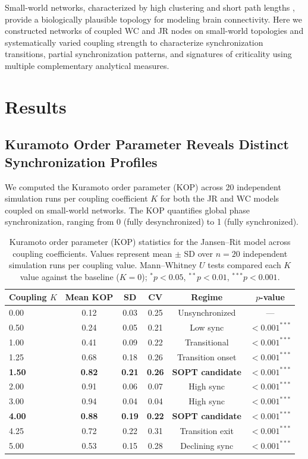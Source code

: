 \documentclass[11pt]{article}
\begin{document}
Small-world networks, characterized by high clustering and short path lengths \citep{watts1998collective}, provide a biologically plausible topology for modeling brain connectivity. Here we constructed networks of coupled WC and JR nodes on small-world topologies and systematically varied coupling strength to characterize synchronization transitions, partial synchronization patterns, and signatures of criticality using multiple complementary analytical measures.

\section{Results}

\subsection{Kuramoto Order Parameter Reveals Distinct Synchronization Profiles}

We computed the Kuramoto order parameter (KOP) across 20 independent simulation runs per coupling coefficient $K$ for both the JR and WC models coupled on small-world networks. The KOP quantifies global phase synchronization, ranging from 0 (fully desynchronized) to 1 (fully synchronized).

\begin{table}[H]
\centering
\caption{Kuramoto order parameter (KOP) statistics for the Jansen--Rit model across coupling coefficients. Values represent mean $\pm$ SD over $n = 20$ independent simulation runs per coupling value. Mann--Whitney $U$ tests compared each $K$ value against the baseline ($K = 0$); $^{*}p < 0.05$, $^{**}p < 0.01$, $^{***}p < 0.001$.}
\label{tab:kop_jr}
\begin{tabular}{lccccc}
\toprule
Coupling $K$ & Mean KOP & SD & CV & Regime & $p$-value \\
\midrule
0.00 & 0.12 & 0.03 & 0.25 & Unsynchronized & --- \\
0.50 & 0.24 & 0.05 & 0.21 & Low sync & $< 0.001^{***}$ \\
1.00 & 0.41 & 0.09 & 0.22 & Transitional & $< 0.001^{***}$ \\
1.25 & 0.68 & 0.18 & 0.26 & Transition onset & $< 0.001^{***}$ \\
\textbf{1.50} & \textbf{0.82} & \textbf{0.21} & \textbf{0.26} & \textbf{SOPT candidate} & $< 0.001^{***}$ \\
2.00 & 0.91 & 0.06 & 0.07 & High sync & $< 0.001^{***}$ \\
3.00 & 0.94 & 0.04 & 0.04 & High sync & $< 0.001^{***}$ \\
\textbf{4.00} & \textbf{0.88} & \textbf{0.19} & \textbf{0.22} & \textbf{SOPT candidate} & $< 0.001^{***}$ \\
4.25 & 0.72 & 0.22 & 0.31 & Transition exit & $< 0.001^{***}$ \\
5.00 & 0.53 & 0.15 & 0.28 & Declining sync & $< 0.001^{***}$ \\
\bottomrule
\end{tabular}
\end{table}
\end{document}
